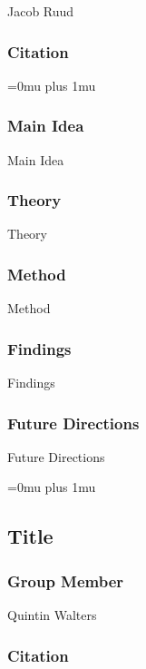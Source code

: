 \noindent
Jacob Ruud

\noindent
\subsubsection{Citation}

\Urlmuskip=0mu plus 1mu\relax

\subsubsection{Main Idea}

\noindent
Main Idea

\subsubsection{Theory}

\noindent
Theory

\subsubsection{Method}

\noindent
Method

\subsubsection{Findings}

\noindent
Findings

\subsubsection{Future Directions}

\noindent
Future Directions 

\Urlmuskip=0mu plus 1mu\relax

\noindent
\subsection{Title}

\subsubsection{Group Member}

\noindent
Quintin Walters

\noindent
\subsubsection{Citation}


